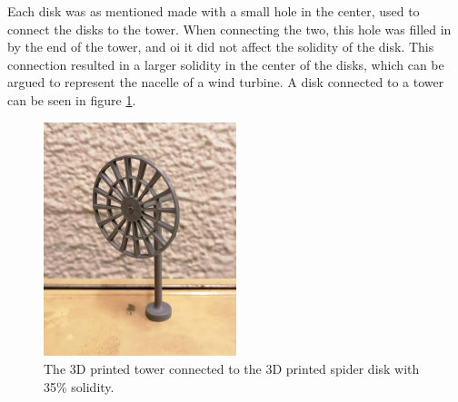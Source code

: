 Each disk was as mentioned made with a small hole in the center, used to connect the disks to the tower. When connecting the two, this hole was filled in by the end of the tower, and oi it did not affect the solidity of the disk. This connection resulted in a larger solidity in the center of the disks, which can be argued to represent the nacelle of a wind turbine. A disk connected to a tower can be seen in figure \ref{Fig:towerAndAD}. 



\begin{figure}
    \centering
    \includegraphics[width=0.5\textwidth]{0_Images/baseAndAD.jpg}    
    \caption{The 3D printed tower connected to the 3D printed \gls{spider} disk with 35\% solidity.}
    \label{Fig:towerAndAD}
\end{figure}



